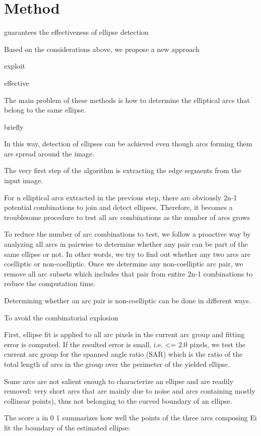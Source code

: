 \documentclass[a4paper]{report}
\begin{document}
\section{Method}

guarantees the effectiveness of ellipse detection

Based on the considerations above, we propose a new approach

exploit


effective

The main problem of
these methods is how to determine the elliptical arcs that
belong to the same ellipse.

briefly

In this way, detection of ellipses can be achieved even though arcs forming them are spread around the image.

The very first step of the algorithm is extracting the edge segments from the input image.

For n elliptical arcs extracted in the previous step, there are obviously 2n-1 potential combinations to join and detect ellipses.
Therefore, it becomes a troublesome procedure to test all arc combinations as the number of arcs grows

To reduce the number of arc combinations to test, we follow a proactive way by analyzing all arcs in pairwise to determine whether any pair can be part of the same ellipse or not. In other words, we try to find out whether any
two arcs are coelliptic or non-coelliptic. Once we determine any non-coelliptic arc pair, we remove all arc subsets which includes that pair from entire 2n-1 combinations to reduce the computation time.

Determining whether an arc pair is non-coelliptic can be done in different ways.

To avoid the combinatorial explosion


First, ellipse fit is applied to all arc pixels in the current arc group and fitting error is computed. 
If the resulted error is small, i.e. <= 2.0 pixels, we test the current arc group for the spanned angle ratio
(SAR) which is the ratio of the total length of arcs in the group over the perimeter of the yielded ellipse.


Some arcs are not salient enough to characterize an ellipse
and are readily removed: very short arcs that are
mainly due to noise and arcs containing mostly collinear points), thus not belonging to the curved
boundary of an ellipse.


The score a in 0 1
summarizes how well the points of the three arcs composing Ei fit the boundary of the estimated ellipse:
\end{document}
